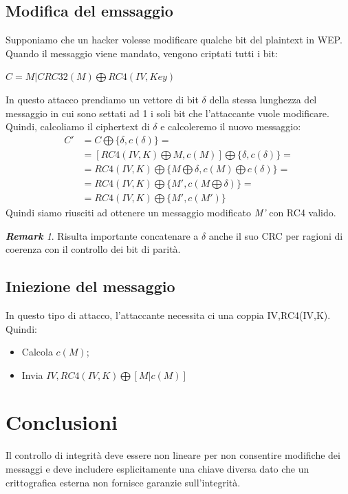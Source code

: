 \documentclass{book}
\theoremstyle{remark}
\newtheorem*{remark}{\textbf{Remark}}
\begin{document}
\section{Modifica del emssaggio}
Supponiamo che un hacker volesse modificare qualche bit del plaintext in WEP\@.\newline
Quando il messaggio viene mandato, vengono criptati tutti i bit:
\begin{center}
	\(C=M|CRC32(M)\bigoplus RC4(IV,Key)\)
\end{center}
In questo attacco prendiamo un vettore di bit \(\delta \) della stessa lunghezza del messaggio in cui sono settati ad 1 i soli bit che l'attaccante vuole modificare\@. Quindi, calcoliamo il ciphertext di \(\delta \) e calcoleremo il nuovo messaggio:
\begin{align*}
	C' & =C\bigoplus \{ \delta,c(\delta)\}=                                \\
	   & =[RC4(IV,K)\bigoplus {M,c(M)}]\bigoplus \{\delta,c(\delta)\}=     \\
	   & =RC4(IV,K)\bigoplus \{M\bigoplus\delta,c(M)\bigoplus c(\delta)\}= \\
	   & =RC4(IV,K)\bigoplus \{M',c(M\bigoplus \delta)\}=                  \\
	   & =RC4(IV,K)\bigoplus \{M',c(M')\}
\end{align*}
Quindi siamo riusciti ad ottenere un messaggio modificato \emph{M'} con RC4 valido\@.
\begin{remark}
	Risulta importante concatenare a \(\delta \) anche il suo CRC per ragioni di coerenza con il controllo dei bit di parità\@.
\end{remark}
\section{Iniezione del messaggio}
In questo tipo di attacco, l'attaccante necessita ci una coppia IV,RC4(IV,K)\@. Quindi:
\begin{itemize}
	\item Calcola \(c(M) \);\@
	\item Invia \(IV,RC4(IV,K)\bigoplus [M|c(M)]\)
\end{itemize}
\chapter{Conclusioni}
Il controllo di integrità deve essere non lineare per non consentire modifiche dei messaggi e deve includere esplicitamente una chiave diversa dato che un crittografica esterna non fornisce garanzie sull'integrità\@.
\end{document}
